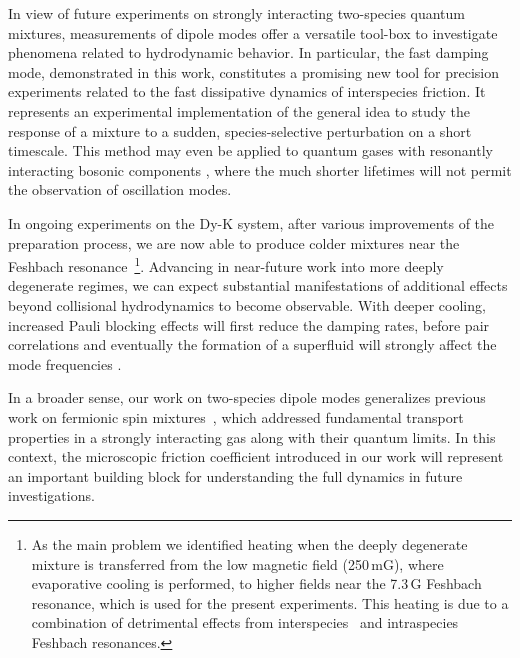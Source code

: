 In view of future experiments on strongly interacting two-species quantum mixtures, measurements of dipole modes offer a versatile tool-box to investigate phenomena related to hydrodynamic behavior. In particular, the fast damping mode, demonstrated in this work, constitutes a promising new tool for precision experiments related to the fast dissipative dynamics of interspecies friction. 
{It represents an experimental implementation of the general idea \cite{Carlini2021sda} to study the response of a mixture to a sudden, species-selective perturbation on a short timescale.
This method} may even be applied to quantum gases with resonantly interacting bosonic components \cite{Varenna2022book}, where the much shorter lifetimes will not permit the observation of oscillation modes. 

{In ongoing experiments on the Dy-K system, after various improvements of the preparation process, we are now able to produce colder mixtures near the Feshbach resonance~\footnote{As the main problem we identified heating when the deeply degenerate mixture is transferred from the low magnetic field (250\,mG), where evaporative cooling is performed, to higher fields near the 7.3\,G Feshbach resonance, which is used for the present experiments. This heating is due to a combination of detrimental effects from interspecies~\cite{Ye2022ool} and intraspecies \cite{Soave2022lff} Feshbach resonances.}. 
Advancing in near-future work into more deeply degenerate regimes,
we can expect substantial manifestations of additional effects beyond collisional hydrodynamics to become observable.
With deeper cooling, increased Pauli blocking effects will first reduce the damping rates, before pair correlations and eventually the formation of a superfluid will strongly affect the mode frequencies \cite{Tajima2020sdm}.}

In a broader sense, our work on two-species dipole modes generalizes previous work on fermionic spin mixtures~\cite{Sommer2011ust, Sommer2011sti}, which addressed fundamental transport properties in a strongly interacting gas along with their quantum limits. In this context, the microscopic friction coefficient introduced in our work will represent an important building block for understanding the full dynamics in future investigations.



